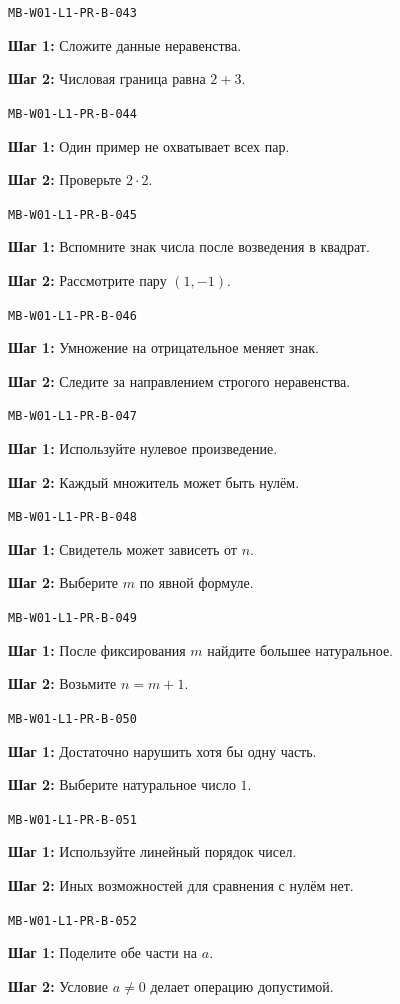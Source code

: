 \documentclass[11pt,a4paper,openany]{book}
\newcommand{\muid}[1]{\texttt{\footnotesize #1}}
\begin{document}
\noindent\muid{MB-W01-L1-PR-B-043}\par 
\textbf{Шаг 1:} Сложите данные неравенства.\par \textbf{Шаг 2:} Числовая граница равна $2+3$.\smallskip

\noindent\muid{MB-W01-L1-PR-B-044}\par 
\textbf{Шаг 1:} Один пример не охватывает всех пар.\par \textbf{Шаг 2:} Проверьте $2\cdot2$.\smallskip

\noindent\muid{MB-W01-L1-PR-B-045}\par 
\textbf{Шаг 1:} Вспомните знак числа после возведения в квадрат.\par \textbf{Шаг 2:} Рассмотрите пару $(1,-1)$.\smallskip

\noindent\muid{MB-W01-L1-PR-B-046}\par 
\textbf{Шаг 1:} Умножение на отрицательное меняет знак.\par \textbf{Шаг 2:} Следите за направлением строгого неравенства.\smallskip

\noindent\muid{MB-W01-L1-PR-B-047}\par 
\textbf{Шаг 1:} Используйте нулевое произведение.\par \textbf{Шаг 2:} Каждый множитель может быть нулём.\smallskip

\noindent\muid{MB-W01-L1-PR-B-048}\par 
\textbf{Шаг 1:} Свидетель может зависеть от $n$.\par \textbf{Шаг 2:} Выберите $m$ по явной формуле.\smallskip

\noindent\muid{MB-W01-L1-PR-B-049}\par 
\textbf{Шаг 1:} После фиксирования $m$ найдите большее натуральное.\par \textbf{Шаг 2:} Возьмите $n=m+1$.\smallskip

\noindent\muid{MB-W01-L1-PR-B-050}\par 
\textbf{Шаг 1:} Достаточно нарушить хотя бы одну часть.\par \textbf{Шаг 2:} Выберите натуральное число $1$.\smallskip

\noindent\muid{MB-W01-L1-PR-B-051}\par 
\textbf{Шаг 1:} Используйте линейный порядок чисел.\par \textbf{Шаг 2:} Иных возможностей для сравнения с нулём нет.\smallskip

\noindent\muid{MB-W01-L1-PR-B-052}\par 
\textbf{Шаг 1:} Поделите обе части на $a$.\par \textbf{Шаг 2:} Условие $a\ne0$ делает операцию допустимой.\smallskip
\end{document}
